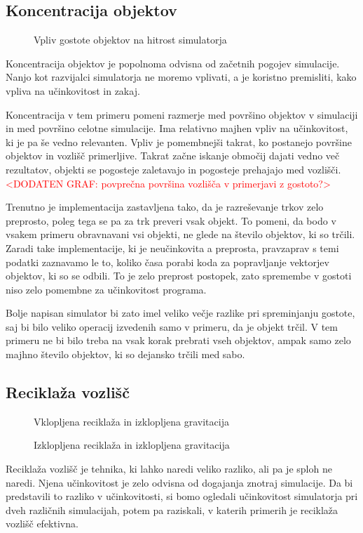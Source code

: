 \documentclass[a4paper,12pt]{article}
\begin{document}
\newpage
\subsection{Koncentracija objektov}

\begin{wrapfigure}{r}{0.5\textwidth}
    \caption{Vpliv gostote objektov na hitrost simulatorja}
\end{wrapfigure}

Koncentracija objektov je popolnoma odvisna od začetnih pogojev simulacije. Nanjo kot razvijalci simulatorja
ne moremo vplivati, a je koristno premisliti, kako vpliva na učinkovitost in zakaj.

Koncentracija v tem primeru pomeni razmerje med površino objektov v simulaciji in med površino celotne simulacije.
Ima relativno majhen vpliv na učinkovitost, ki je pa še vedno relevanten. Vpliv je pomembnejši takrat, ko postanejo
površine objektov in vozlišč primerljive. Takrat začne iskanje območij dajati vedno več rezultatov, objekti se pogosteje
zaletavajo in pogosteje prehajajo med vozlišči. \textcolor{red}{<DODATEN GRAF: povprečna površina vozlišča v primerjavi z gostoto?>}

Trenutno je implementacija zastavljena tako, da je razreševanje trkov zelo preprosto, poleg tega se pa za trk preveri vsak
objekt. To pomeni, da bodo v vsakem primeru obravnavani vsi objekti, ne glede na število objektov, ki so trčili.
Zaradi take implementacije, ki je neučinkovita a preprosta, pravzaprav s temi podatki zaznavamo le to, koliko časa porabi
koda za popravljanje vektorjev objektov, ki so se odbili. To je zelo preprost postopek, zato spremembe v gostoti niso zelo pomembne
za učinkovitost programa.

Bolje napisan simulator bi zato imel veliko večje razlike pri spreminjanju gostote, saj bi bilo veliko
operacij izvedenih samo v primeru, da je objekt trčil. V tem primeru ne bi bilo treba na vsak korak prebrati vseh objektov,
ampak samo zelo majhno število objektov, ki so dejansko trčili med sabo.
\newpage
\subsection{Reciklaža vozlišč}
\begin{wrapfigure}{r}{0.45\textwidth}
    \caption{Vklopljena reciklaža in izklopljena gravitacija}
    \vspace{0.5cm}
    \caption{Izklopljena reciklaža in izklopljena gravitacija}
\end{wrapfigure}
Reciklaža vozlišč je tehnika, ki lahko naredi veliko razliko, ali pa je sploh ne naredi. Njena učinkovitost
je zelo odvisna od dogajanja znotraj simulacije. Da bi predstavili to razliko v učinkovitosti, si bomo ogledali
učinkovitost simulatorja pri dveh različnih simulacijah, potem pa raziskali, v katerih primerih je reciklaža vozlišč efektivna.
\end{document}
